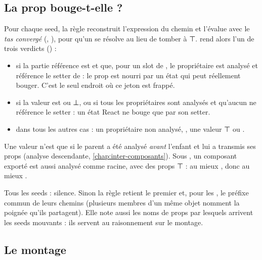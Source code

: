 \subsection{La prop bouge-t-elle ?}


Pour chaque seed, la règle reconstruit l'expression du chemin et l'évalue avec le \emph{tas convergé} (, ), pour qu'un  se résolve au lieu de tomber à ⊤.  rend alors l'un de trois verdicts () :

\begin{itemize}
  \item {} si la partie référence est  et que, pour un slot  de , le propriétaire est analysé et référence le setter de  : le prop est nourri par un état qui peut réellement bouger. C'est le seul endroit où ce jeton est frappé.
  \item {} si la valeur est  ou ⊥, ou si tous les propriétaires sont analysés et qu'aucun ne référence le setter : un état React ne bouge que par son setter.
  \item {} dans tous les autres cas : un propriétaire non analysé, , une valeur ⊤ ou .
\end{itemize}

Une valeur n'est  que si le parent a été analysé \emph{avant} l'enfant et lui a transmis ses props (analyse descendante, \cref{chap:inter-composants}). Sous , un composant exporté est aussi analysé comme racine, avec des props ⊤ : au mieux , donc au mieux \Warning.

Tous les seeds  : silence. Sinon la règle retient le premier  et, pour les , le préfixe commun de leurs chemins (plusieurs membres d'un même objet nomment la poignée qu'ils partagent). Elle note aussi les noms de props par lesquels arrivent les seeds mouvants : ils servent au raisonnement sur le montage.

\subsection{Le montage}

